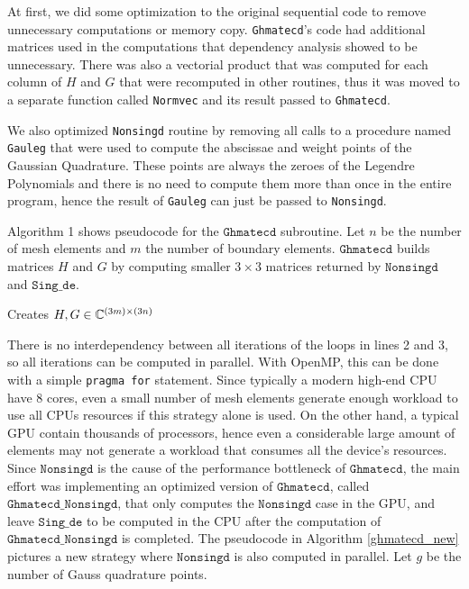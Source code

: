 At first, we did some optimization to the original sequential code to remove unnecessary computations or memory copy.
\texttt{Ghmatecd}'s code had additional matrices used in the computations that dependency analysis showed to be unnecessary. 
There was also a vectorial product that was computed for each column of $H$ and $G$ that were recomputed in other 
routines, thus it was moved to a separate function called \texttt{Normvec} and its result passed to \texttt{Ghmatecd}.

We also optimized \texttt{Nonsingd} routine by removing all calls to a procedure named \texttt{Gauleg} that 
were used to compute the abscissae and weight points of the Gaussian Quadrature. These points are always the 
zeroes of the Legendre Polynomials and there is no need to compute them more than once in the entire program, 
hence the result of \texttt{Gauleg} can just be passed to \texttt{Nonsingd}.

Algorithm 1 shows pseudocode for the $\texttt{Ghmatecd}$ subroutine. Let $n$ be the number of mesh 
elements and $m$ the number of boundary elements. $\texttt{Ghmatecd}$ builds matrices $H$ and $G$ by computing 
smaller $3\times3$ matrices returned by $\texttt{Nonsingd}$ and $\texttt{Sing\_de}$.
%
\begin{algorithm}[H]
\label{ghmatecd_old}
\caption{Creates $H, G \in \mathbb{C}^{(3m)\times(3n)}$}
\begin{algorithmic}[1]
				\Else
				\EndIf
			\EndFor
	 \EndFor
	\EndProcedure
\end{algorithmic}
\end{algorithm}
%
There is no interdependency between all iterations of the loops in lines 2 and 3, so all iterations can be computed 
in parallel. With OpenMP, this can be done with a simple \texttt{pragma for} statement. Since typically a modern high-end 
CPU have 8 cores, even a small number of mesh elements generate enough 
workload to use all CPUs resources if this strategy alone is used. On the other hand, a typical GPU contain thousands 
of processors, hence even a considerable large amount of elements may not generate a workload that consumes all the device's 
resources. Since $\texttt{Nonsingd}$ is the cause of the performance bottleneck of $\texttt{Ghmatecd}$, 
the main effort was implementing
an optimized version of $\texttt{Ghmatecd}$, called $\texttt{Ghmatecd\_Nonsingd}$, that only computes the $\texttt{Nonsingd}$
case in the GPU, and leave $\texttt{Sing\_de}$ to be computed in the CPU after the computation of $\texttt{Ghmatecd\_Nonsingd}$ 
is completed. The pseudocode in Algorithm \ref{ghmatecd_new} pictures a new strategy where $\texttt{Nonsingd}$ is also computed in parallel.
Let $g$ be the number of Gauss quadrature points.

